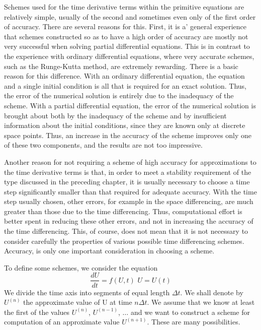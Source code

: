 Schemes used for the time derivative terms within the primitive equations are relatively simple, usually of the second and sometimes even only of the first order of accuracy. There are several reasons for this. First, it is a’ general experience that schemes constructed so as to have a high order of accuracy are mostly not very successful when solving partial differential equations. This is in contrast to the experience with ordinary differential equations, where very accurate schemes, such as the Runge-Kutta method, are extremely rewarding. There is a basic reason for this difference. With an ordinary differential equation, the equation and a single initial condition is all that is required for an exact solution. Thus, the error of the numerical solution is entirely due to the inadequacy of the scheme. With a partial differential equation, the error of the numerical solution is brought about both by the inadequacy of the scheme and by insufficient information about the initial conditions, since they are known only at discrete space points. Thus, an increase in the accuracy of the scheme improves only one of these two components, and the results are not too impressive.

Another reason for not requiring a scheme of high accuracy for approximations to the time derivative terms is that, in order to meet a stability requirement of the type discussed in the preceding chapter, it is usually necessary to choose a time step significantly smaller than that required for adequate accuracy. With the time step usually chosen, other errors, for example in the space differencing, are much greater than those due to the time differencing. Thus, computational effort is better spent in reducing these other errors, and not in increasing the accuracy of the time differencing. This, of course, does not mean that it is not necessary to consider carefully the properties of various possible time differencing schemes. Accuracy, is only one important consideration in choosing a scheme.

To define some schemes, we consider the equation
\begin{equation}\label{eq.3.1.3}
    \frac{dU}{dt}= f(U,t) \,\, U=U(t)
\end{equation}
We divide the time axis into segments of equal length $\Delta t$. We shall denote by 
$U^{(n)}$ the approximate value of U at time $n\Delta t$. We assume that we know at least the first of the values $U^{(n)}$, $U^{(n-1)}$, $\dots$ and we want to construct a scheme for computation of an approximate value $U^{(n+1)}$. These are many possibilities.
